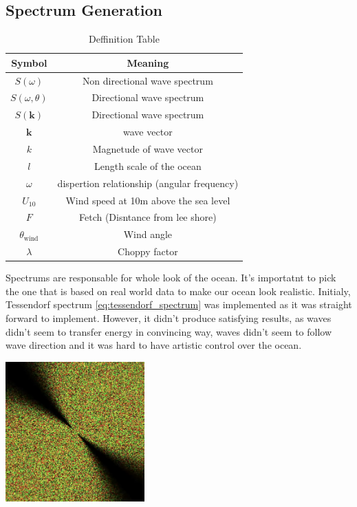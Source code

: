 \subsection{Spectrum Generation}

\begin{table}[H]
    \centering
    \begin{tabular}{|c|c|}
        \hline
        \textbf{Symbol} & \textbf{Meaning} \\
        \hline
        $S(\omega)$ & Non directional wave spectrum \\
        $S(\omega, \theta)$ & Directional wave spectrum\\
        $S(\mathbf{k})$ & Directional wave spectrum\\
        $\mathbf{k}$ & wave vector \\
        $k$ & Magnetude of wave vector\\
        $l$ & Length scale of the ocean\\
        $\omega$ & dispertion relationship (angular frequency)\\
        $U_{10}$ & Wind speed at 10m above the sea level\\
        $F$ & Fetch (Disntance from lee shore)\\
        $\theta_{\text{wind}}$ & Wind angle\\
        $\lambda$ & Choppy factor\\
        \hline
    \end{tabular}
    \caption{Deffinition Table}
    \label{table:deffinition_table}
\end{table}

Spectrums are responsable for whole look of the ocean. It's importatnt to pick the one that is based on real world data to make our ocean look realistic.
Initialy, Tessendorf spectrum \ref{eq:tessendorf_spectrum} was implemented as it was straight forward to implement. However, it didn't produce satisfying results, as waves didn't seem to transfer energy in convincing way, waves didn't seem to follow wave direction and it was hard to have artistic control over the ocean.

\begin{minipage}{1\textwidth}
    \centering
    \includegraphics[width=0.4\textwidth]{"images/phillips_spectrum.png"}
    \label{fig:phillips_spectrum}
\end{minipage}

